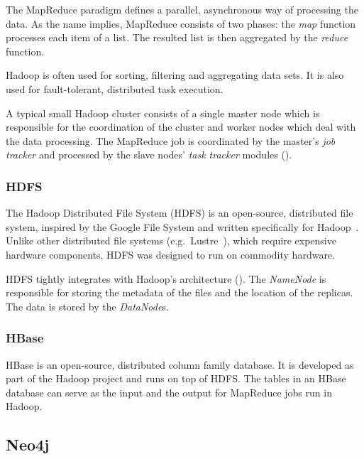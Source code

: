 The MapReduce paradigm defines a parallel, asynchronous way of processing the data. As the name implies, MapReduce consists of two phases: the \emph{map} function processes each item of a list. The resulted list is then aggregated by the \emph{reduce} function.

Hadoop is often used for sorting, filtering and aggregating data sets. It is also used for fault-tolerant, distributed task execution.

A typical small Hadoop cluster consists of a single master node which is responsible for the coordination of the cluster and worker nodes which deal with the data processing. The MapReduce job is coordinated by the master's \emph{job tracker} and processed by the slave nodes' \emph{task tracker} modules ().


\subsubsection{HDFS}

The Hadoop Distributed File System (HDFS) is an open-source, distributed file system, inspired by the Google File System and written specifically for Hadoop~\cite{Hadoop}. Unlike other distributed file systems (e.g.\ Lustre~\cite{Lustre}), which require expensive hardware components, HDFS was designed to run on commodity hardware.

HDFS tightly integrates with Hadoop's architecture (). The \emph{NameNode} is responsible for storing the metadata of the files and the location of the replicas. The data is stored by the \emph{DataNode}s.


\subsubsection{HBase}

HBase is an open-source, distributed column family database. It is developed as part of the Hadoop project and runs on top of HDFS. The tables in an HBase database can serve as the input and the output for MapReduce jobs run in Hadoop.

\subsection{Neo4j}
\label{subsec:neo4j}

